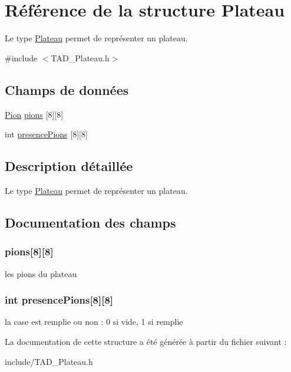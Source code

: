 \hypertarget{struct_plateau}{\section{Référence de la structure Plateau}
\label{struct_plateau}
}


Le type \hyperlink{struct_plateau}{Plateau} permet de représenter un plateau.  




{\ttfamily \#include $<$T\-A\-D\-\_\-\-Plateau.\-h$>$}

\subsection*{Champs de données}
\begin{DoxyCompactItemize}
\item 
\hyperlink{struct_pion}{Pion} \hyperlink{struct_plateau_aa14649bf1b37b316f42ffcb79c1951a5}{pions} \mbox{[}8\mbox{]}\mbox{[}8\mbox{]}
\item 
int \hyperlink{struct_plateau_a5df6e631fe34def5ff04a0b4dd233ae5}{presence\-Pions} \mbox{[}8\mbox{]}\mbox{[}8\mbox{]}
\end{DoxyCompactItemize}


\subsection{Description détaillée}
Le type \hyperlink{struct_plateau}{Plateau} permet de représenter un plateau. 

\subsection{Documentation des champs}
\hypertarget{struct_plateau_aa14649bf1b37b316f42ffcb79c1951a5}{
\subsubsection[{pions}]{ pions\mbox{[}8\mbox{]}\mbox{[}8\mbox{]}}}\label{struct_plateau_aa14649bf1b37b316f42ffcb79c1951a5}
les pions du plateau \hypertarget{struct_plateau_a5df6e631fe34def5ff04a0b4dd233ae5}{
\subsubsection[{presence\-Pions}]{\setlength{\rightskip}{0pt plus 5cm}int presence\-Pions\mbox{[}8\mbox{]}\mbox{[}8\mbox{]}}}\label{struct_plateau_a5df6e631fe34def5ff04a0b4dd233ae5}
la case est remplie ou non \-: 0 si vide, 1 si remplie 

La documentation de cette structure a été générée à partir du fichier suivant \-:\begin{DoxyCompactItemize}
\item 
include/T\-A\-D\-\_\-\-Plateau.\-h\end{DoxyCompactItemize}
